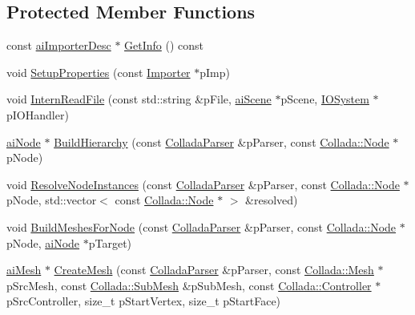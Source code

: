 \subsection*{Protected Member Functions}
\begin{DoxyCompactItemize}
\item 
const \hyperlink{structai_importer_desc}{ai\+Importer\+Desc} $\ast$ \hyperlink{class_assimp_1_1_collada_loader_a111a0ed539c7da04244623a066a718d2}{Get\+Info} () const 
\item 
void \hyperlink{class_assimp_1_1_collada_loader_a4289309c9ba9306807e73195d1c969cb}{Setup\+Properties} (const \hyperlink{class_assimp_1_1_importer}{Importer} $\ast$p\+Imp)
\item 
void \hyperlink{class_assimp_1_1_collada_loader_a9d79ca753279dee692fa191ca7b6c84a}{Intern\+Read\+File} (const std\+::string \&p\+File, \hyperlink{structai_scene}{ai\+Scene} $\ast$p\+Scene, \hyperlink{class_assimp_1_1_i_o_system}{I\+O\+System} $\ast$p\+I\+O\+Handler)
\item 
\hyperlink{structai_node}{ai\+Node} $\ast$ \hyperlink{class_assimp_1_1_collada_loader_a7a98b2c21b0f4b63387f2ed5162439f7}{Build\+Hierarchy} (const \hyperlink{class_assimp_1_1_collada_parser}{Collada\+Parser} \&p\+Parser, const \hyperlink{struct_assimp_1_1_collada_1_1_node}{Collada\+::\+Node} $\ast$p\+Node)
\item 
void \hyperlink{class_assimp_1_1_collada_loader_a96d5f081bc7382901ac41a3afcb41be5}{Resolve\+Node\+Instances} (const \hyperlink{class_assimp_1_1_collada_parser}{Collada\+Parser} \&p\+Parser, const \hyperlink{struct_assimp_1_1_collada_1_1_node}{Collada\+::\+Node} $\ast$p\+Node, std\+::vector$<$ const \hyperlink{struct_assimp_1_1_collada_1_1_node}{Collada\+::\+Node} $\ast$ $>$ \&resolved)
\item 
void \hyperlink{class_assimp_1_1_collada_loader_ae81b95f32274e08f033961df69828fd4}{Build\+Meshes\+For\+Node} (const \hyperlink{class_assimp_1_1_collada_parser}{Collada\+Parser} \&p\+Parser, const \hyperlink{struct_assimp_1_1_collada_1_1_node}{Collada\+::\+Node} $\ast$p\+Node, \hyperlink{structai_node}{ai\+Node} $\ast$p\+Target)
\item 
\hyperlink{structai_mesh}{ai\+Mesh} $\ast$ \hyperlink{class_assimp_1_1_collada_loader_aed3569be31505133704b0ebcf89c7f1f}{Create\+Mesh} (const \hyperlink{class_assimp_1_1_collada_parser}{Collada\+Parser} \&p\+Parser, const \hyperlink{struct_assimp_1_1_collada_1_1_mesh}{Collada\+::\+Mesh} $\ast$p\+Src\+Mesh, const \hyperlink{struct_assimp_1_1_collada_1_1_sub_mesh}{Collada\+::\+Sub\+Mesh} \&p\+Sub\+Mesh, const \hyperlink{struct_assimp_1_1_collada_1_1_controller}{Collada\+::\+Controller} $\ast$p\+Src\+Controller, size\+\_\+t p\+Start\+Vertex, size\+\_\+t p\+Start\+Face)

\end{DoxyCompactItemize}
